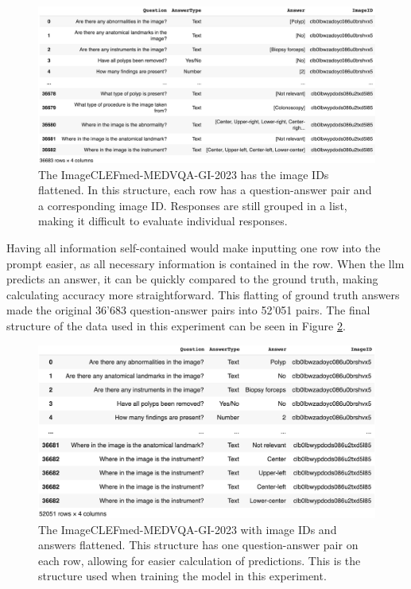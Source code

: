         \begin{figure}[htb]
            \centering
            \centerline{
            \includegraphics[width=1.2\textwidth]{images/colon_vqa_pandas.png}}
            \caption{The ImageCLEFmed-MEDVQA-GI-2023 has the image IDs flattened. In this structure, each row has a question-answer pair and a corresponding image ID. Responses are still grouped in a list, making it difficult to evaluate individual responses.}
            \label{fig:colon_vqa_pandas}
        \end{figure}

        Having all information self-contained would make inputting one row into the prompt easier, as all necessary information is contained in the row. 
        When the \gls{llm} predicts an answer, it can be quickly compared to the ground truth, making calculating accuracy more straightforward.
        This flatting of ground truth answers made the original 36'683 question-answer pairs into 52'051 pairs.
        The final structure of the data used in this experiment can be seen in Figure \ref{fig:colon_vqa_pandas_exploded}.

        \begin{figure}[htb]
            \centering
            \centerline{
            \includegraphics[width=1.2\textwidth]{images/colon_vqa_pandas_exploded.png}}
            \caption{The ImageCLEFmed-MEDVQA-GI-2023 with image IDs and answers flattened. This structure has one question-answer pair on each row, allowing for easier calculation of predictions. This is the structure used when training the model in this experiment.}
            \label{fig:colon_vqa_pandas_exploded}
        \end{figure}

